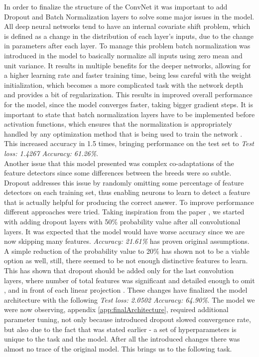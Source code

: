 \documentclass{article} %
\begin{document}
In order to finalize the structure of the ConvNet it was important to add Dropout and Batch Normalization layers to solve some major issues in the model. All deep neural networks tend to have an internal covariate shift problem, which is defined as a change in the distribution of each layer’s inputs, due to the change in parameters after each layer. To manage this problem batch normalization was introduced in the model to basically normalize all inputs using zero mean and unit variance. It results in multiple benefits for the deeper networks, allowing for a higher learning rate and faster training time, being less careful with the weight initialization, which becomes a more complicated task with the network depth and provides a bit of regularization. This results in improved overall performance for the model, since the model converges faster, taking bigger gradient steps. It is important to state that batch normalization layers have to be implemented before activation functions, which ensures that the normalization is appropriately handled by any optimization method that is being used to train the network \cite{ioffe2015batch}. This increased accuracy in 1.5 times, bringing performance on the test set to \emph{Test loss: 1.4267 Accuracy: 61.26\%}. \\
Another issue that this model presented was complex co-adaptations of the feature detectors since some differences between the breeds were so subtle. Dropout addresses this issue by randomly omitting some percentage of feature detectors on each training set, thus enabling neurons to learn to detect a feature that is actually helpful for producing the correct answer. To improve performance different approaches were tried. Taking inspiration from the paper \cite{hinton2012improving}, we started with adding dropout layers with 50\% probability value after all convolutional layers. It was expected that the model would have worse accuracy since we are now skipping many features. \emph{Accuracy: 21.61\%} has proven original assumptions. A simple reduction of the probability value to 20\% has shown not to be a viable option as well, still, there seemed to be not enough distinctive features to learn. This has shown that dropout should be added only for the last convolution layers, where number of total features was significant and detailed enough to omit \cite{inproceedings}, and in front of each linear projection \cite{JMLRv15srivastava14a}. 
These changes have finalized the model architecture with the following \emph{Test loss: 2.0502 Accuracy: 64.90\%}. The model we were now observing, appendix \ref{app:finalArchitecture}, required additional parameter tuning, not only because introduced dropout slowed convergence rate, but also due to the fact that was stated earlier - a set of hyperparameters is unique to the task and the model. After all the introduced changes there was almost no trace of the original model. This brings us to the following task.
\end{document}
